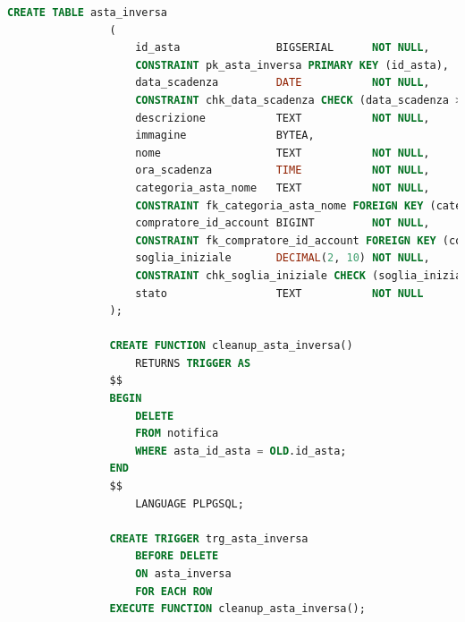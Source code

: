             \begin{lstlisting}[language=SQL, caption=Relazione asta inversa]
                CREATE TABLE asta_inversa
                (
                    id_asta               BIGSERIAL      NOT NULL,
                    CONSTRAINT pk_asta_inversa PRIMARY KEY (id_asta),
                    data_scadenza         DATE           NOT NULL,
                    CONSTRAINT chk_data_scadenza CHECK (data_scadenza > NOW()),
                    descrizione           TEXT           NOT NULL,
                    immagine              BYTEA,
                    nome                  TEXT           NOT NULL,
                    ora_scadenza          TIME           NOT NULL,
                    categoria_asta_nome   TEXT           NOT NULL,
                    CONSTRAINT fk_categoria_asta_nome FOREIGN KEY (categoria_asta_nome) REFERENCES categoria_asta (nome) ON UPDATE CASCADE ON DELETE CASCADE,
                    compratore_id_account BIGINT         NOT NULL,
                    CONSTRAINT fk_compratore_id_account FOREIGN KEY (compratore_id_account) REFERENCES compratore (id_account) ON UPDATE CASCADE ON DELETE CASCADE,
                    soglia_iniziale       DECIMAL(2, 10) NOT NULL,
                    CONSTRAINT chk_soglia_iniziale CHECK (soglia_iniziale >= 0),
                    stato                 TEXT           NOT NULL
                );
                
                CREATE FUNCTION cleanup_asta_inversa()
                    RETURNS TRIGGER AS
                $$
                BEGIN
                    DELETE
                    FROM notifica
                    WHERE asta_id_asta = OLD.id_asta;
                END
                $$
                    LANGUAGE PLPGSQL;
                
                CREATE TRIGGER trg_asta_inversa
                    BEFORE DELETE
                    ON asta_inversa
                    FOR EACH ROW
                EXECUTE FUNCTION cleanup_asta_inversa();
            \end{lstlisting}
            
